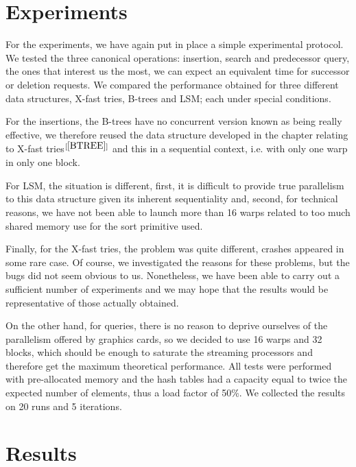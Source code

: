 
\section{Experiments}\label{PARALLELXFASTTRIERESULTS}

For the experiments, we have again put in place a simple experimental protocol. We tested the three canonical operations: insertion, search and predecessor query, the ones that interest us the most, we can expect an equivalent time for successor or deletion requests. We compared the performance obtained for three different data structures, X-fast tries, B-trees and LSM; each under special conditions.

For the insertions, the B-trees have no concurrent version known as being really effective, we therefore reused the data structure developed in the chapter relating to X-fast tries$^{[\ref{BTREE}]}$ and this in a sequential context, i.e. with only one warp in only one block.

For LSM, the situation is different, first, it is difficult to provide true parallelism to this data structure given its inherent sequentiality and, second, for technical reasons, we have not been able to launch more than 16 warps related to too much shared memory use for the sort primitive used.

Finally, for the X-fast tries, the problem was quite different, crashes appeared in some rare case. Of course, we investigated the reasons for these problems, but the bugs did not seem obvious to us. Nonetheless, we have been able to carry out a sufficient number of experiments and we may hope that the results would be representative of those actually obtained.

On the other hand, for queries, there is no reason to deprive ourselves of the parallelism offered by graphics cards, so we decided to use 16 warps and 32 blocks, which should be enough to saturate the streaming processors and therefore get the maximum theoretical performance. All tests were performed with pre-allocated memory and the hash tables had a capacity equal to twice the expected number of elements, thus a load factor of 50\%. We collected the results on 20 runs and 5 iterations.

\section{Results}

